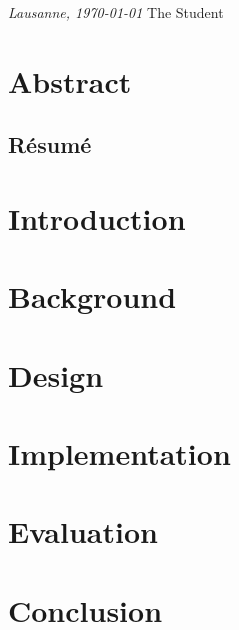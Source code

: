 \documentclass[a4paper,11pt,oneside]{report}
\newcommand{\thesisauthor}{The Student}
\begin{document}
\bigskip
 
\noindent\textit{Lausanne, \today}
\hfill \thesisauthor

\cleardoublepage
\chapter*{Abstract}
\lipsum[1-2]


\begin{otherlanguage}{french}
\cleardoublepage
\chapter*{Résumé}
\lipsum[1-2]
\end{otherlanguage}


\cleardoublepage
{}
\tableofcontents
\setlength{\parskip}{1em}


\chapter{Introduction}


\chapter{Background}
\chapter{Design}
\chapter{Implementation}
\chapter{Evaluation}
\chapter{Conclusion}

\nocite{*}
\printbibliography
\end{document}
